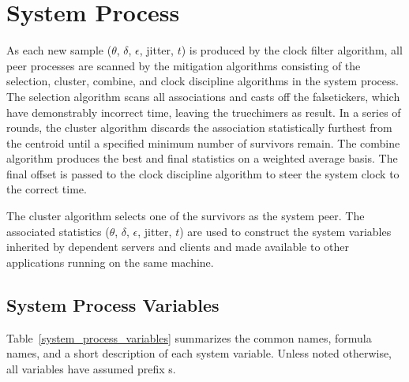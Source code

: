 \chapter{System Process}
\label{section-11}

As each new sample ($ \theta $, $ \delta $, $ \epsilon $, jitter, $ t $) is produced by
the clock filter algorithm, all peer processes are scanned by the
mitigation algorithms consisting of the selection, cluster, combine,
and clock discipline algorithms in the system process.  The selection
algorithm scans all associations and casts off the falsetickers,
which have demonstrably incorrect time, leaving the truechimers as
result.  In a series of rounds, the cluster algorithm discards the
association statistically furthest from the centroid until a
specified minimum number of survivors remain.  The combine algorithm
produces the best and final statistics on a weighted average basis.
The final offset is passed to the clock discipline algorithm to steer
the system clock to the correct time.

The cluster algorithm selects one of the survivors as the system
peer.  The associated statistics ($ \theta $, $ \delta $, $ \epsilon $, jitter, $ t $)
are used to construct the system variables inherited by dependent
servers and clients and made available to other applications running
on the same machine.

\section{System Process Variables}
\label{section-11-1}

Table~\ref{system_process_variables} summarizes the common names, formula names, and a short
description of each system variable.  Unless noted otherwise, all
variables have assumed prefix s.

